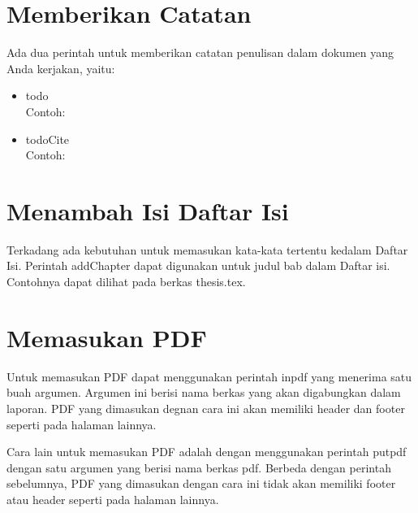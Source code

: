 	\section{Memberikan Catatan}
	Ada dua perintah untuk memberikan catatan penulisan dalam dokumen yang Anda
	kerjakan, yaitu:
	\begin{itemize}
		\item \bslash todo \\
		      Contoh: \\ 
		\item \bslash todoCite \\
		      Contoh: \todoCite
	\end{itemize}


	\section{Menambah Isi Daftar Isi}
	Terkadang ada kebutuhan untuk memasukan kata-kata tertentu kedalam Daftar Isi.
	Perintah \bslash addChapter dapat digunakan untuk judul bab dalam Daftar isi.
	Contohnya dapat dilihat pada berkas thesis.tex.


	\section{Memasukan PDF}
	Untuk memasukan PDF dapat menggunakan perintah \bslash inpdf yang menerima satu
	buah argumen. Argumen ini berisi nama berkas yang akan digabungkan dalam
	laporan. PDF yang dimasukan degnan cara ini akan memiliki header dan footer
	seperti pada halaman lainnya.


	Cara lain untuk memasukan PDF adalah dengan menggunakan perintah \bslash putpdf
	dengan satu argumen yang berisi nama berkas pdf. Berbeda dengan perintah
	sebelumnya, PDF yang dimasukan dengan cara ini tidak akan memiliki footer atau
	header seperti pada halaman lainnya.



